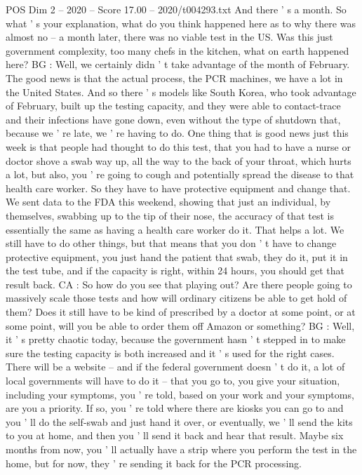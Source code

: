 \begin{textsample}{POS Dim 2 – 2020 – Score 17.00 – 2020/t004293.txt}
And there ' s a month.
So what ' s your explanation, what do you think happened here as to why there was almost no -- a month later, there was no viable test in the US.
Was this just government complexity, too many chefs in the kitchen, what on earth happened here?
BG : Well, we certainly didn ' t take advantage of the month of February.
The good news is that the actual process, the PCR machines, we have a lot in the United States.
And so there ' s models like South Korea, who took advantage of February, built up the testing capacity, and they were able to contact-trace and their infections have gone down, even without the type of shutdown that, because we ' re late, we ' re having to do.
One thing that is good news just this week is that people had thought to do this test, that you had to have a nurse or doctor shove a swab way up, all the way to the back of your throat, which hurts a lot, but also, you ' re going to cough and potentially spread the disease to that health care worker.
So they have to have protective equipment and change that.
We sent data to the FDA this weekend, showing that just an individual, by themselves, swabbing up to the tip of their nose, the accuracy of that test is essentially the same as having a health care worker do it.
That helps a lot.
We still have to do other things, but that means that you don ' t have to change protective equipment, you just hand the patient that swab, they do it, put it in the test tube, and if the capacity is right, within 24 hours, you should get that result back.
CA : So how do you see that playing out?
Are there people going to massively scale those tests and how will ordinary citizens be able to get hold of them?
Does it still have to be kind of prescribed by a doctor at some point, or at some point, will you be able to order them off Amazon or something?
BG : Well, it ' s pretty chaotic today, because the government hasn ' t stepped in to make sure the testing capacity is both increased and it ' s used for the right cases.
There will be a website -- and if the federal government doesn ' t do it, a lot of local governments will have to do it -- that you go to, you give your situation, including your symptoms, you ' re told, based on your work and your symptoms, are you a priority.
If so, you ' re told where there are kiosks you can go to and you ' ll do the self-swab and just hand it over, or eventually, we ' ll send the kits to you at home, and then you ' ll send it back and hear that result.
Maybe six months from now, you ' ll actually have a strip where you perform the test in the home, but for now, they ' re sending it back for the PCR processing.

\end{textsample}
